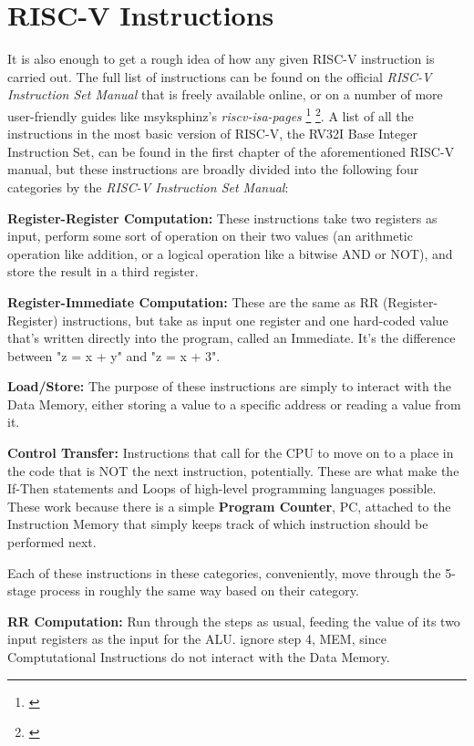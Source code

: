 \documentclass[12pt,twoside]{reedthesis}
\begin{document}
\section{RISC-V Instructions}

It is also enough to get a rough idea of how any given RISC-V instruction is carried out. The full list of instructions can be found on the official \textit{RISC-V Instruction Set Manual} that is freely available online, or on a number of more user-friendly guides like msyksphinz's \textit{riscv-isa-pages} \footnote{\cite{waterman}} \footnote{\cite{msyksphinz}}. A list of all the instructions in the most basic version of RISC-V, the RV32I Base Integer Instruction Set, can be found in the first chapter of the aforementioned RISC-V manual, but these instructions are broadly divided into the following four categories by the \textit{RISC-V Instruction Set Manual}:


\textbf{Register-Register Computation:} These instructions take two registers as input, perform some sort of operation on their two values (an arithmetic operation like addition, or a logical operation like a bitwise AND or NOT), and store the result in a third register.

\textbf{Register-Immediate Computation:} These are the same as RR (Register-Register) instructions, but take as input one register and one hard-coded value that's written directly into the program, called an Immediate. It's the difference between "z = x + y" and "z = x + 3".

\textbf{Load/Store:} The purpose of these instructions are simply to interact with the Data Memory, either storing a value to a specific address or reading a value from it.

\textbf{Control Transfer:} Instructions that call for the CPU to move on to a place in the code that is NOT the next instruction, potentially. These are what make the If-Then statements and Loops of high-level programming languages possible. These work because there is a simple \textbf{Program Counter}, PC, attached to the Instruction Memory that simply keeps track of which instruction should be performed next.

Each of these instructions in these categories, conveniently, move through the 5-stage process in roughly the same way based on their category.

\textbf{RR Computation:} Run through the steps as usual, feeding the value of its two input registers as the input for the ALU. ignore step 4, MEM, since Comptutational Instructions do not interact with the Data Memory.
\end{document}
